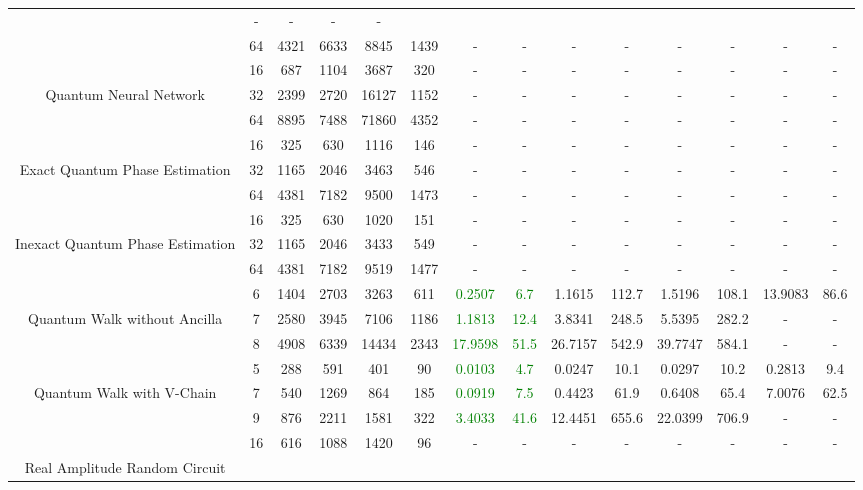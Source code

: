 \begin{table}[htb]
{\begin{tabular}{|c|c|c|c|c|c|c|c|c|c|c|c|c|c|}
 & - & -
 & - & -
 \\
 & 
64 & 4321 & 6633 & 8845 & 1439
 & - & -
 & - & -
 & - & -
 & - & -
 \\
\hline
 & 
16 & 687 & 1104 & 3687 & 320
 & - & -
 & - & -
 & - & -
 & - & -
 \\
Quantum Neural Network & 
32 & 2399 & 2720 & 16127 & 1152
 & - & -
 & - & -
 & - & -
 & - & -
 \\
 & 
64 & 8895 & 7488 & 71860 & 4352
 & - & -
 & - & -
 & - & -
 & - & -
 \\
\hline
 & 
16 & 325 & 630 & 1116 & 146
 & - & -
 & - & -
 & - & -
 & - & -
 \\
Exact Quantum Phase Estimation & 
32 & 1165 & 2046 & 3463 & 546
 & - & -
 & - & -
 & - & -
 & - & -
 \\
 & 
64 & 4381 & 7182 & 9500 & 1473
 & - & -
 & - & -
 & - & -
 & - & -
 \\
\hline
 & 
16 & 325 & 630 & 1020 & 151
 & - & -
 & - & -
 & - & -
 & - & -
 \\
Inexact Quantum Phase Estimation & 
32 & 1165 & 2046 & 3433 & 549
 & - & -
 & - & -
 & - & -
 & - & -
 \\
 & 
64 & 4381 & 7182 & 9519 & 1477
 & - & -
 & - & -
 & - & -
 & - & -
 \\
\hline
 & 
6 & 1404 & 2703 & 3263 & 611
 & \textcolor{green}{0.2507} & \textcolor{green}{6.7}
 & 1.1615 & 112.7
 & 1.5196 & 108.1
 & 13.9083 & 86.6
 \\
Quantum Walk without Ancilla & 
7 & 2580 & 3945 & 7106 & 1186
 & \textcolor{green}{1.1813} & \textcolor{green}{12.4}
 & 3.8341 & 248.5
 & 5.5395 & 282.2
 & - & -
 \\
 & 
8 & 4908 & 6339 & 14434 & 2343
 & \textcolor{green}{17.9598} & \textcolor{green}{51.5}
 & 26.7157 & 542.9
 & 39.7747 & 584.1
 & - & -
 \\
\hline
 & 
5 & 288 & 591 & 401 & 90
 & \textcolor{green}{0.0103} & \textcolor{green}{4.7}
 & 0.0247 & 10.1
 & 0.0297 & 10.2
 & 0.2813 & 9.4
 \\
Quantum Walk with V-Chain & 
7 & 540 & 1269 & 864 & 185
 & \textcolor{green}{0.0919} & \textcolor{green}{7.5}
 & 0.4423 & 61.9
 & 0.6408 & 65.4
 & 7.0076 & 62.5
 \\
 & 
9 & 876 & 2211 & 1581 & 322
 & \textcolor{green}{3.4033} & \textcolor{green}{41.6}
 & 12.4451 & 655.6
 & 22.0399 & 706.9
 & - & -
 \\
\hline
 & 
16 & 616 & 1088 & 1420 & 96
 & - & -
 & - & -
 & - & -
 & - & -
 \\
Real Amplitude Random Circuit & 

\end{tabular}}
\end{table}
